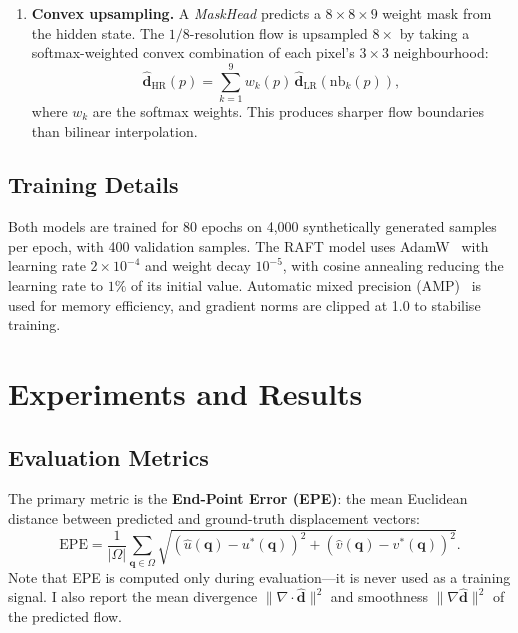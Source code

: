 \documentclass[11pt, a4paper]{article}
\newcommand{\vect}[1]{\bm{#1}}
\begin{document}
\begin{enumerate}
    \item \textbf{Convex upsampling.}
    A \emph{MaskHead} predicts a $8 \times 8 \times 9$ weight mask from the hidden state.
    The $1/8$-resolution flow is upsampled $8\times$ by taking a softmax-weighted convex combination of each pixel's $3 \times 3$ neighbourhood:
    \begin{equation}
        \hat{\vect{d}}_\text{HR}(p) = \sum_{k=1}^{9} w_k(p)\, \hat{\vect{d}}_\text{LR}(\text{nb}_k(p)),
        \label{eq:convex_up}
    \end{equation}
    where $w_k$ are the softmax weights. This produces sharper flow boundaries than bilinear interpolation.
\end{enumerate}

\subsection{Training Details}

Both models are trained for 80 epochs on 4{,}000 synthetically generated samples per epoch, with 400 validation samples.
The RAFT model uses AdamW~\cite{loshchilov2019adamw} with learning rate $2 \times 10^{-4}$ and weight decay $10^{-5}$, with cosine annealing reducing the learning rate to $1\%$ of its initial value.
Automatic mixed precision (AMP)~\cite{micikevicius2018mixed} is used for memory efficiency, and gradient norms are clipped at 1.0 to stabilise training.

\section{Experiments and Results}
\label{sec:results}

\subsection{Evaluation Metrics}

The primary metric is the \textbf{End-Point Error (EPE)}: the mean Euclidean distance between predicted and ground-truth displacement vectors:
\begin{equation}
    \text{EPE} = \frac{1}{|\Omega|} \sum_{\vect{q} \in \Omega} \sqrt{(\hat{u}(\vect{q}) - u^*(\vect{q}))^2 + (\hat{v}(\vect{q}) - v^*(\vect{q}))^2}.
    \label{eq:epe}
\end{equation}
Note that EPE is computed only during evaluation---it is never used as a training signal.
I also report the mean divergence $\|\nabla \cdot \hat{\vect{d}}\|^2$ and smoothness $\|\nabla \hat{\vect{d}}\|^2$ of the predicted flow.
\end{document}
